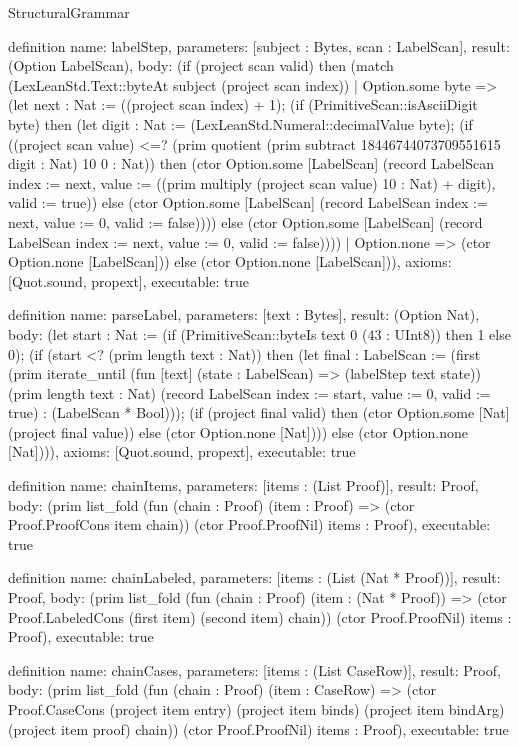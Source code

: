 \begin{lexlean}{StructuralGrammar}
\begin{semanticmodule}
{{definition{
  name: labelStep,
  parameters: [subject : Bytes, scan : LabelScan],
  result: (Option LabelScan),
  body: (if (project scan valid) then (match (LexLeanStd.Text::byteAt subject (project scan index))
    | Option.some byte => (let next : Nat := ((project scan index) + 1); (if (PrimitiveScan::isAsciiDigit byte) then (let digit : Nat := (LexLeanStd.Numeral::decimalValue byte); (if ((project scan value) <=? (prim quotient (prim subtract 18446744073709551615 digit : Nat) 10 0 : Nat)) then (ctor Option.some [LabelScan] (record LabelScan {index := next, value := ((prim multiply (project scan value) 10 : Nat) + digit), valid := true})) else (ctor Option.some [LabelScan] (record LabelScan {index := next, value := 0, valid := false})))) else (ctor Option.some [LabelScan] (record LabelScan {index := next, value := 0, valid := false}))))
    | Option.none => (ctor Option.none [LabelScan])) else (ctor Option.none [LabelScan])),
  axioms: [Quot.sound, propext],
  executable: true
}

definition{
  name: parseLabel,
  parameters: [text : Bytes],
  result: (Option Nat),
  body: (let start : Nat := (if (PrimitiveScan::byteIs text 0 (43 : UInt8)) then 1 else 0); (if (start <? (prim length text : Nat)) then (let final : LabelScan := (first (prim iterate_until (fun [text] (state : LabelScan) => (labelStep text state)) (prim length text : Nat) (record LabelScan {index := start, value := 0, valid := true}) : (LabelScan * Bool))); (if (project final valid) then (ctor Option.some [Nat] (project final value)) else (ctor Option.none [Nat]))) else (ctor Option.none [Nat]))),
  axioms: [Quot.sound, propext],
  executable: true
}

definition{
  name: chainItems,
  parameters: [items : (List Proof)],
  result: Proof,
  body: (prim list_fold (fun (chain : Proof) (item : Proof) => (ctor Proof.ProofCons item chain)) (ctor Proof.ProofNil) items : Proof),
  executable: true
}

definition{
  name: chainLabeled,
  parameters: [items : (List (Nat * Proof))],
  result: Proof,
  body: (prim list_fold (fun (chain : Proof) (item : (Nat * Proof)) => (ctor Proof.LabeledCons (first item) (second item) chain)) (ctor Proof.ProofNil) items : Proof),
  executable: true
}

definition{
  name: chainCases,
  parameters: [items : (List CaseRow)],
  result: Proof,
  body: (prim list_fold (fun (chain : Proof) (item : CaseRow) => (ctor Proof.CaseCons (project item entry) (project item binds) (project item bindArg) (project item proof) chain)) (ctor Proof.ProofNil) items : Proof),
  executable: true
}

}}
\end{semanticmodule}
\end{lexlean}
